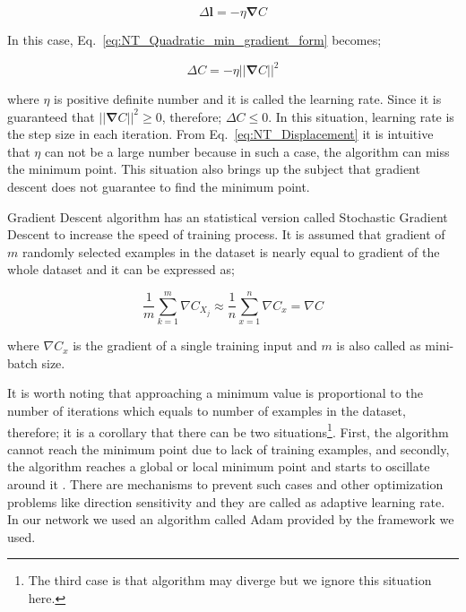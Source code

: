 \documentclass[a4paper,times,hidelinks,12pt]{article}
\begin{document}
\begin{equation}
\label{eq:NT_learning_rate}
\Delta{\boldsymbol{l}} = -\eta\boldsymbol{\nabla}C
\end{equation}

\noindent In this case, Eq.~\eqref{eq:NT_Quadratic_min_gradient_form} becomes;

\begin{equation}
\label{eq:NT_Displacement}
\Delta{C} = -\eta ||\boldsymbol{\nabla}{C}||^2
\end{equation}

\noindent where $\eta$ is positive definite number and it is called the learning rate. Since it is guaranteed that $||\boldsymbol{\nabla}{C}||^2 \geq 0$, therefore; $\Delta{C} \leq 0$. In this situation, learning rate is the step size in each iteration. From Eq.~\eqref{eq:NT_Displacement} it is intuitive that $\eta$ can not be a large number because in such a case, the algorithm can miss the minimum point. This situation also brings up the subject that gradient descent does not guarantee to find the minimum point.

Gradient Descent algorithm has an statistical version called Stochastic Gradient Descent to increase the speed of training process. It is assumed that gradient of  $m$ randomly selected examples in the dataset is nearly equal to gradient of the whole dataset and it can be expressed as;

\begin{equation}
\label{eq:NT_Stochastic}
\frac{1}{m} \sum\limits_{k = 1}^{m} \nabla{C_{X_j}} \approx \frac{1}{n}\sum\limits_{x = 1}^{n} \nabla{C_{x}} = \nabla{C}
\end{equation}

\noindent where $\nabla{C_x}$ is the gradient of a single training input and $m$ is also called as mini-batch size.

It is worth noting that approaching a minimum value is proportional to the number of iterations which equals to number of examples in the dataset, therefore; it is a corollary that there can be two situations\footnote{The third case is that algorithm may diverge but we ignore this situation here.}. First, the algorithm cannot reach the minimum point due to lack of training examples, and secondly, the algorithm reaches a global or local minimum point and starts to oscillate around it \cite{zeiler2012adadelta}. There are mechanisms to prevent such cases and other optimization problems like direction sensitivity and they are called as adaptive learning rate. In our network we used an algorithm called Adam \cite{kingma2014adam} provided by the framework we used.  
\end{document}
